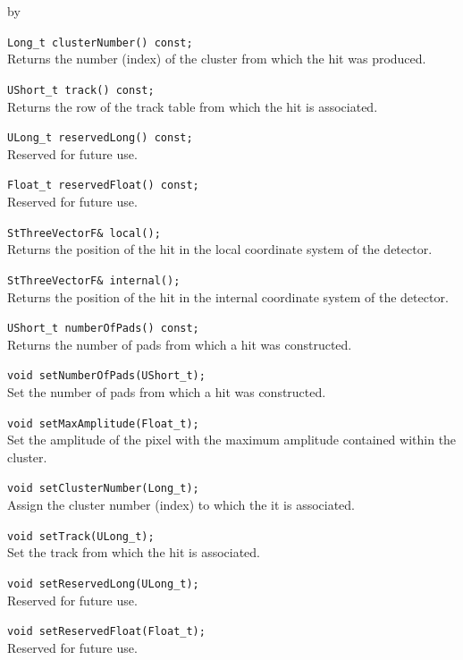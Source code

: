 \documentclass[twoside]{article}
\newcommand{\entrylabel}[1]{\mbox{\textbf{{#1}}}\hfil}%
\newenvironment{entry}
{\begin{list}{}%
    {\renewcommand{\makelabel}{\entrylabel}%
     \setlength{\labelwidth}{90pt}%
     \setlength{\leftmargin}{\labelwidth}
     \advance\leftmargin by \labelsep%
      }%
    }%
  {\end{list}}
\newcommand{\Entrylabel}[1]%
{\raisebox{0pt}[1ex][0pt]{\makebox[\labelwidth][l]%
    {\parbox[t]{\labelwidth}{\hspace{0pt}\textbf{{#1}}}}}}
\newenvironment{Entry}%
{\renewcommand{\entrylabel}{\Entrylabel}\begin{entry}}%
  {\end{entry}}
\begin{document}
\begin{Entry}
    \verb+Long_t clusterNumber() const;+\\
    Returns the number (index) of the cluster from which the
    hit was produced.

    \verb+UShort_t track() const;+\\
    Returns the row of the track table from which the hit is
    associated.

    \verb+ULong_t reservedLong() const;+\\
    Reserved for future use.

    \verb+Float_t reservedFloat() const;+\\
    Reserved for future use.

    \verb+StThreeVectorF& local();+\\
    Returns the position of the hit in the local coordinate
    system of the detector.

    \verb+StThreeVectorF& internal();+\\
    Returns the position of the hit in the internal coordinate
    system of the detector.

    \verb+UShort_t numberOfPads() const;+\\
    Returns the number of pads from which a hit was
    constructed.
    
    \verb+void setNumberOfPads(UShort_t);+\\
    Set the number of pads from which a hit was
    constructed.
    
    \verb+void setMaxAmplitude(Float_t);+\\
    Set the amplitude of the pixel with the maximum
    amplitude contained within the cluster.

    \verb+void setClusterNumber(Long_t);+\\
    Assign the cluster number (index) to which the
    it is associated.

    \verb+void setTrack(ULong_t);+\\
    Set the track from which the hit is associated.

    \verb+void setReservedLong(ULong_t);+\\
    Reserved for future use.

    \verb+void setReservedFloat(Float_t);+\\
    Reserved for future use.
\end{Entry}
\clearpage
\end{document}

